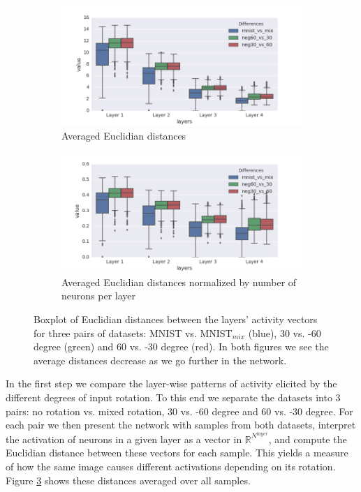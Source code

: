 \documentclass[10pt,a4paper]{article}
\begin{document}
\begin{figure}
\centering
\begin{subfigure}{.5\textwidth}
  \centering
  \includegraphics[width=1\linewidth]{euc_diffs.png}
  \caption{\footnotesize{Averaged Euclidian distances}}
  \label{fig:euc_dists}
\end{subfigure}%
\begin{subfigure}{.5\textwidth}
  \centering
  \includegraphics[width=1\linewidth]{euc_diffs_normalized.png}
  \caption{\footnotesize{Averaged Euclidian distances normalized by number of neurons per layer}}
  \label{fig:euc_dists_normalized}
\end{subfigure}
\caption{\footnotesize{Boxplot of Euclidian distances between the layers' activity vectors for three pairs of datasets: MNIST vs. MNIST$_{mix}$ (blue), 30 vs. -60 degree (green) and 60 vs. -30 degree (red). In both figures we see the average distances decrease as we go further in the network. }}
\label{fig:Euclidian_distances}
\end{figure}


In the first step we compare the layer-wise patterns of activity elicited by the different degrees of input rotation. To this end we separate the datasets into 3 pairs:  no rotation vs. mixed rotation, 30 vs. -60 degree and 60 vs. -30 degree. For each pair we then present the network with samples from both datasets, interpret the activation of neurons in a given layer as a vector in $\mathbb{R}^{N^{layer}}$, and compute the Euclidian distance between these vectors for each sample. This yields a measure of how the same image causes different activations depending on its rotation. Figure \ref{fig:Euclidian_distances}  shows these distances averaged over all samples. \newline 
\end{document}
